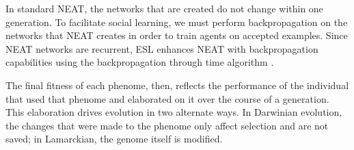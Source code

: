 \documentclass{sig-alternate}
\begin{document}
In standard NEAT, the networks that are created do not change within one generation. To facilitate social learning, we must perform backpropagation \cite{rumelhart1986learning} on the networks that NEAT creates in order to train agents on accepted examples. Since NEAT networks are recurrent, ESL enhances NEAT with backpropagation capabilities using the backpropagation through time algorithm \cite{werbos1990backpropagation}.

The final fitness of each phenome, then, reflects the performance of the individual that used that phenome and elaborated on it over the course of a generation. This elaboration drives evolution in two alternate ways.  In Darwinian evolution, the changes that were made to the phenome only affect selection and are not saved; in Lamarckian, the genome itself is modified.
\end{document}

